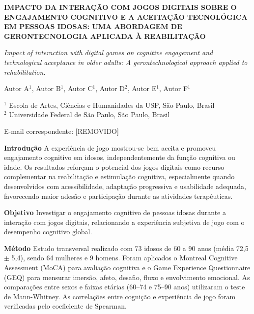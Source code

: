 \documentclass[12pt,a4paper]{article}
\begin{document}
\begin{center}

{\large\bfseries IMPACTO DA INTERAÇÃO COM JOGOS DIGITAIS SOBRE O ENGAJAMENTO
COGNITIVO E A ACEITAÇÃO TECNOLÓGICA EM PESSOAS IDOSAS: UMA
ABORDAGEM DE GERONTECNOLOGIA APLICADA À REABILITAÇÃO}

\vspace{0.5cm}

{\normalsize
\textit{Impact of interaction with digital games on cognitive engagement and technological
acceptance in older adults: A gerontechnological approach applied to rehabilitation.}
}

\vspace{0.5cm}

Autor A$^{1}$, Autor B$^{1}$, Autor C$^{1}$,
Autor D$^{2}$, Autor E$^{1}$, Autor F$^{1}$

\vspace{0.2cm}

$^{1}$ Escola de Artes, Ciências e Humanidades da USP, São Paulo, Brasil\\
$^{2}$ Universidade Federal de São Paulo, São Paulo, Brasil

\vspace{0.2cm}

E-mail correspondente: [REMOVIDO]

\end{center}

\textbf{Introdução} A experiência de jogo mostrou-se bem aceita e promoveu engajamento
cognitivo em idosos, independentemente da função cognitiva ou idade. Os resultados
reforçam o potencial dos jogos digitais como recurso complementar na reabilitação e
estimulação cognitiva, especialmente quando desenvolvidos com acessibilidade,
adaptação progressiva e usabilidade adequada, favorecendo maior adesão e participação
durante as atividades terapêuticas.

\textbf{Objetivo} Investigar o engajamento cognitivo de pessoas idosas durante a interação
com jogos digitais, relacionando a experiência subjetiva de jogo com o desempenho
cognitivo global.

\textbf{Método} Estudo transversal realizado com 73 idosos de 60 a 90 anos
(média 72,5 $\pm$ 5,4), sendo 64 mulheres e 9 homens. Foram aplicados o Montreal
Cognitive Assessment (MoCA) para avaliação cognitiva e o Game Experience
Questionnaire (GEQ) para mensurar imersão, afeto, desafio, fluxo e envolvimento
emocional. As comparações entre sexos e faixas etárias (60--74 e 75--90 anos)
utilizaram o teste de Mann-Whitney. As correlações entre cognição e experiência de
jogo foram verificadas pelo coeficiente de Spearman.
\end{document}
